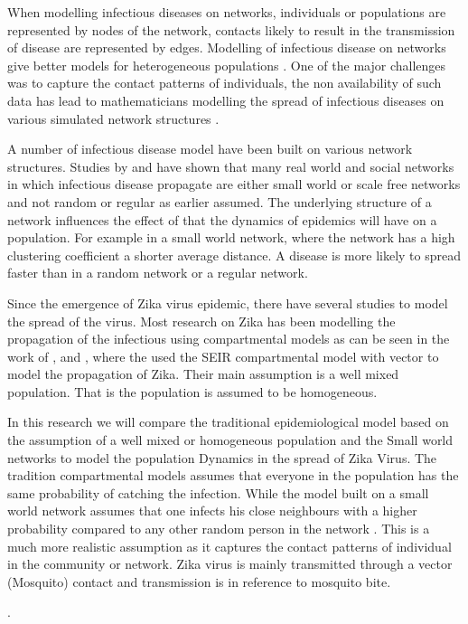 When modelling infectious diseases on networks, individuals or populations are represented by nodes of the network, contacts likely to result in the transmission of disease are represented by edges. Modelling of infectious disease on networks give better models for heterogeneous populations \citep{ming2016stochastic}. One of the major challenges was to capture the contact patterns of individuals, the non availability of such data has lead to mathematicians modelling the spread of infectious diseases on various simulated network structures \citep{pastor2001}.

A number of infectious disease model have been built on various network structures. Studies by \citep{watts1998collective} and \cite{barabasi1999emergence} have shown that many real world and social networks in which infectious disease propagate are either small world or scale free networks and not random or regular as earlier assumed. The underlying structure of a network influences  the effect of that the dynamics of epidemics will have on a population. For example in a small world network, where the network has a high clustering coefficient a shorter average distance. A disease is more likely to spread faster than in a random network or a regular network.

Since the emergence of Zika virus epidemic, there have several studies to model the spread of the virus. Most research on Zika has been modelling the propagation of the infectious using compartmental models as can be seen in the work of \cite{1}, \cite{2} and \cite{3}, where the used the SEIR compartmental model with vector to model the propagation of Zika. Their main assumption is a well mixed population. That is the population is assumed to be homogeneous.
 
In this research we will compare the traditional epidemiological model based on the  assumption of a well mixed or homogeneous population and the Small world networks to model the population Dynamics in the spread of Zika Virus. The tradition compartmental models assumes that everyone in the population has the same probability of catching the infection. While  the model built on a small world network assumes that  one infects his close neighbours with a higher probability compared to any other random person in the network \citep{newman2002random}. This is a much more realistic assumption as it captures the contact patterns of individual in the community or network. Zika virus is mainly transmitted through a vector (Mosquito) contact and transmission is in reference to mosquito bite.

.

